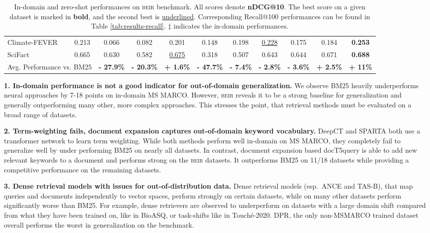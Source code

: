\documentclass{article}
\newcommand{\custo}[1]{\textsc{\normalsize #1}}
\newcommand{\beir}{\custo{beir}\xspace}
\begin{document}
\begin{table}[t!]
{\begin{tabular}{l | c | c c c | c c c c | c | c}
   Climate-FEVER & 0.213 & 0.066 & 0.082 & 0.201 & 0.148 & 0.198 & \underline{0.228} & 0.175 & 0.184 & \textbf{0.253}\\ 
   SciFact       & 0.665 & 0.630 & 0.582 & \underline{0.675} & 0.318 & 0.507 & 0.643 & 0.644 & 0.671 & \textbf{0.688} \\ \midrule
   \multicolumn{2}{c|}{Avg. Performance vs. BM25} & \textbf{- 27.9\%} & \textbf{- 20.3\%} & \textbf{+ 1.6\%} & \textbf{- 47.7\%} & \textbf{- 7.4\%} & \textbf{ - 2.8\%} & \textbf{ - 3.6\%} & \textbf{+ 2.5\%} & \textbf{+ 11\%} \\ 
        \bottomrule
    \end{tabular}}
    \caption{In-domain and zero-shot performances on \beir benchmark. All scores denote \textbf{nDCG@10}. The best score on a given dataset is marked in \textbf{bold}, and the second best is \underline{underlined}. Corresponding Recall@100 performances can be found in Table \ref{tab:results-recall}. $\ddagger$ indicates the in-domain performances. \vspace{-5mm}}
    \label{tab:results}
\end{table}

 \textbf{1. In-domain performance is not a good indicator for out-of-domain generalization.} We observe BM25 heavily underperforms neural approaches by 7-18 points on in-domain MS MARCO. However, \beir reveals it to be a strong baseline for generalization and generally outperforming many other, more complex approaches. This stresses the point, that retrieval methods must be evaluated on a broad range of datasets.
 
\textbf{2. Term-weighting fails, document expansion captures out-of-domain keyword vocabulary.}  DeepCT and SPARTA both use a transformer network to learn term weighting. While both methods perform well in-domain on MS MARCO, they completely fail to generalize well by under performing BM25 on nearly all datasets. In contrast, document expansion based docT5query is able to add new relevant keywords to a document and performs strong on the \beir datasets. It outperforms BM25 on 11/18 datasets while providing  a competitive performance on the remaining datasets.  

\textbf{3. Dense retrieval models with issues for out-of-distribution data.} Dense retrieval models (esp.\ ANCE and TAS-B), that map queries and documents independently to vector spaces, perform strongly on certain datasets, while on many other datasets perform significantly worse than BM25. For example, dense retrievers are observed to underperform on datasets with a large domain shift compared from what they have been trained on, like in BioASQ, or task-shifts like in Touch\'e-2020. DPR, the only non-MSMARCO trained dataset overall performs the worst in generalization on the benchmark.
\end{document}
